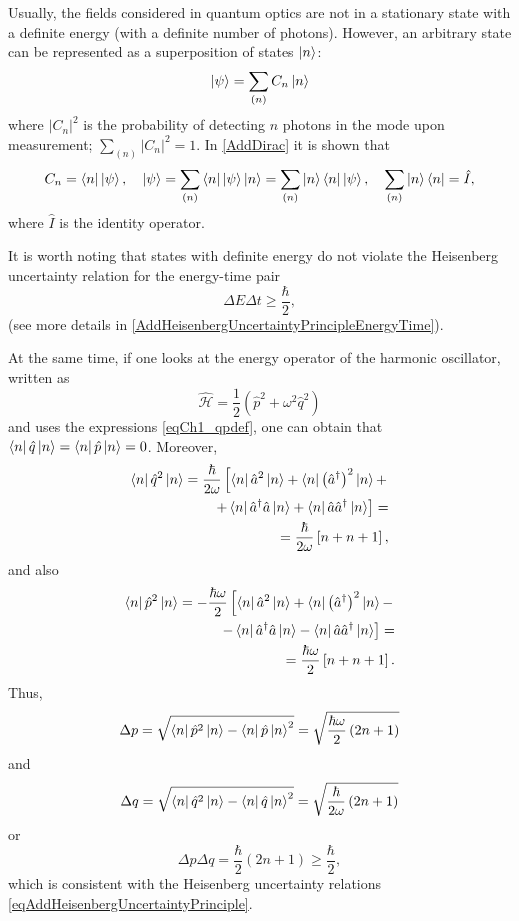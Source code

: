 Usually, the fields considered in quantum optics are not
in a stationary state with a definite energy (with a definite number of
photons). However, an arbitrary state can be represented as
a superposition of states $\ket{n}$: 
\begin{equation}
\left|\psi\right> = \sum_{(n)} C_n \ket{n}
\end{equation}
where $\left|C_n\right|^2$ is the probability of detecting $n$
photons in the mode upon measurement; $\sum_{(n)} \left|C_n\right|^2 = 1$. 
In \autoref{AddDirac} it is shown that
\[
C_n = \bra{ n }\left| \psi \right>, \quad
\left| \psi \right> = \sum_{(n)} \bra{ n }\left| \psi \right>
\ket{ n } =
\sum_{(n)} \ket{ n }\bra{ n }\left| \psi \right>,
\quad
\sum_{(n)} \ket{ n }\bra{ n } = \hat{I},
\]
where $\hat{I}$ is the identity operator.

\begin{remark}
  It is worth noting that states with definite energy do not violate 
  the Heisenberg uncertainty relation for the energy-time pair
  \[
  \Delta E \Delta t \ge \frac{\hbar}{2},
  \]
  (see more details in \autoref{AddHeisenbergUncertaintyPrincipleEnergyTime}). 

  At the same time, if one looks at the energy operator of the harmonic
  oscillator, written as
  \[
  \hat{\mathcal{H}} =\frac{1}{2} \left(\hat{p}^2 +
  \omega^2\hat{q}^2\right)
  \]
  and uses the expressions \eqref{eqCh1_qpdef}, one can obtain
  that $\bra{n}\hat{q}\ket{n} =
  \bra{n}\hat{p}\ket{n} = 0$. Moreover,
  \begin{eqnarray}
    \bra{n}\hat{q}^2\ket{n} = \frac{\hbar}{2 \omega}
    \left[
      \bra{n}\hat{a}^2\ket{n} +
      \bra{n}\left(\hat{a}^{\dag}\right)^2\ket{n} +
      \right.
      \nonumber \\
      \left.
      +
      \bra{n}\hat{a}^{\dag}\hat{a}\ket{n} +
      \bra{n}\hat{a}\hat{a}^{\dag}\ket{n}
      \right] =
    \nonumber \\
    = \frac{\hbar}{2 \omega}
    \left[n + n + 1\right],
    \nonumber
  \end{eqnarray}
  and also
  \begin{eqnarray}
    \bra{n}\hat{p}^2\ket{n} = - \frac{\hbar \omega}{2}
    \left[
      \bra{n}\hat{a}^2\ket{n} +
      \bra{n}\left(\hat{a}^{\dag}\right)^2\ket{n} - \right.
      \nonumber \\
      \left.
      -
      \bra{n}\hat{a}^{\dag}\hat{a}\ket{n} -
      \bra{n}\hat{a}\hat{a}^{\dag}\ket{n}
      \right] =
    \nonumber \\
    = \frac{\hbar \omega}{2}
    \left[n + n + 1\right].
    \nonumber
  \end{eqnarray}
  Thus,
  \[
  \Delta p = \sqrt{\bra{n}\hat{p}^2\ket{n} -
    \bra{n}\hat{p}\ket{n}^2} =
  \sqrt{\frac{\hbar \omega}{2}\left(2n + 1\right)}
  \]
  and
  \[
  \Delta q = \sqrt{\bra{n}\hat{q}^2\ket{n} -
    \bra{n}\hat{q}\ket{n}^2} =
  \sqrt{\frac{\hbar}{2\omega}\left(2n + 1\right)}
  \]
  or
  \[
  \Delta p \Delta q = \frac{\hbar}{2}\left(2n + 1\right) \ge \frac{\hbar}{2},
  \]
  which is consistent with the Heisenberg uncertainty relations
  \eqref{eqAddHeisenbergUncertaintyPrinciple}.


\end{remark}
